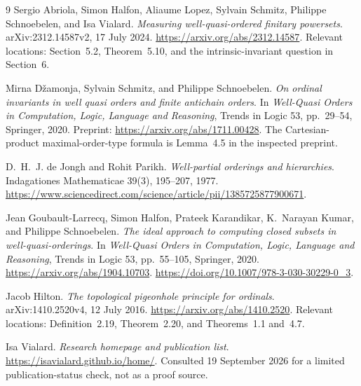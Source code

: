 \documentclass[11pt,letterpaper]{article}
\theoremstyle{teal}
\theoremstyle{definition}
\begin{document}
\begin{thebibliography}{9}
Sergio Abriola, Simon Halfon, Aliaume Lopez, Sylvain Schmitz, Philippe Schnoebelen, and Isa Vialard.
\emph{Measuring well-quasi-ordered finitary powersets}.
arXiv:2312.14587v2, 17 July 2024.
\url{https://arxiv.org/abs/2312.14587}.
Relevant locations: Section~5.2, Theorem~5.10, and the intrinsic-invariant question in Section~6.

Mirna D\v zamonja, Sylvain Schmitz, and Philippe Schnoebelen.
\emph{On ordinal invariants in well quasi orders and finite antichain orders}.
In \emph{Well-Quasi Orders in Computation, Logic, Language and Reasoning},
Trends in Logic 53, pp.~29--54, Springer, 2020.
Preprint: \url{https://arxiv.org/abs/1711.00428}.
The Cartesian-product maximal-order-type formula is Lemma~4.5 in the inspected preprint.

D.~H.~J. de Jongh and Rohit Parikh.
\emph{Well-partial orderings and hierarchies}.
Indagationes Mathematicae 39(3), 195--207, 1977.
\url{https://www.sciencedirect.com/science/article/pii/1385725877900671}.

Jean Goubault-Larrecq, Simon Halfon, Prateek Karandikar,
K.~Narayan Kumar, and Philippe Schnoebelen.
\emph{The ideal approach to computing closed subsets in well-quasi-orderings}.
In \emph{Well-Quasi Orders in Computation, Logic, Language and Reasoning},
Trends in Logic 53, pp.~55--105, Springer, 2020.
\url{https://arxiv.org/abs/1904.10703}.
\url{https://doi.org/10.1007/978-3-030-30229-0_3}.

Jacob Hilton.
\emph{The topological pigeonhole principle for ordinals}.
arXiv:1410.2520v4, 12 July 2016.
\url{https://arxiv.org/abs/1410.2520}.
Relevant locations: Definition~2.19, Theorem~2.20, and Theorems~1.1 and~4.7.

Isa Vialard.
\emph{Research homepage and publication list}.
\url{https://isavialard.github.io/home/}.
Consulted 19 September 2026 for a limited publication-status check, not as a proof source.
\end{thebibliography}
\end{document}
